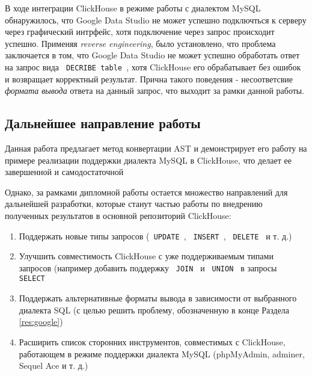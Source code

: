 В ходе интеграции ClickHouse в режиме работы с диалектом MySQL обнаружилось, что Google Data Studio не может успешно подключться к серверу через графический интрфейс, хотя подключение через запрос происходит успешно. Применяя \textit{reverse engineering}, было установлено, что проблема заключается в том, что Google Data Studio не может успешно обработать ответ на запрос вида \texttt{ DECRIBE table }, хотя ClickHouse его обрабатывает без ошибок и возвращает корректный результат. Прична такого поведения - несоответсвие \textit{формата вывода} ответа на данный запрос, что выходит за рамки данной работы. 

\subsection{Дальнейшее направление работы}
Данная работа предлагает метод конвертации AST и демонстрирует его работу на примере реализации поддержки диалекта MySQL в ClickHouse, что делает ее завершенной и самодостаточной

Однако, за рамками дипломной работы остается множество направлений для дальнейшей разработки, которые станут частью работы по внедрению полученных результатов в основной репозиторий ClickHouse:
\begin{enumerate}
    \item Поддержать новые типы запросов (\texttt{ UPDATE }, \texttt{ INSERT }, \texttt{ DELETE } и т. д.)
    \item Улучшить совместимость ClickHouse с уже поддерживаемым типами запросов (например добавить поддержку \texttt{ JOIN } и \texttt{ UNION } в запросы \texttt{ SELECT }
    \item Поддержать альтернативные форматы вывода в зависимости от выбранного диалекта SQL (с целью решить проблему, обозначенную в конце Раздела \ref{res:google})
    \item Расширить список сторонних инструментов, совместимых с ClickHouse, работающем в режиме поддержки диалекта MySQL (phpMyAdmin, adminer, Sequel Ace и т. д.)
\end{enumerate}

\pagebreak
